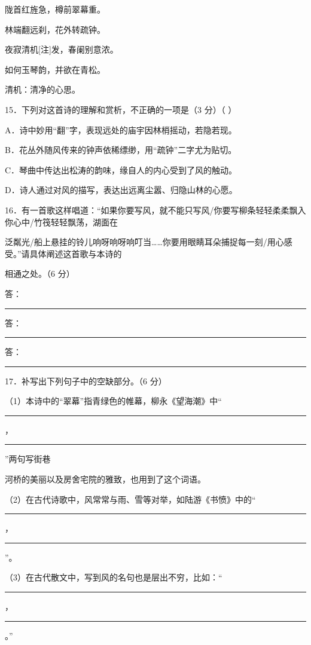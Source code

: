 \documentclass[UTF8,a4paper,fontset=fandol]{ctexart}
\begin{document}
\vspace{0.35em}\par
\hspace*{1.8em}陇首红旌急，樽前翠幕重。\par
\hspace*{1.8em}林端翻远刹，花外转疏钟。\par
\hspace*{1.8em}夜寂清机[注]发，春阑别意浓。\par
\hspace*{1.8em}如何玉琴韵，并欲在青松。\par
[注] 清机：清净的心思。\par
\vspace{0.35em}\par
15．下列对这首诗的理解和赏析，不正确的一项是（3 分）（ ）\par
A．诗中妙用“翻”字，表现远处的庙宇因林梢摇动，若隐若现。\par
B．花丛外随风传来的钟声依稀缥缈，用“疏钟”二字尤为贴切。\par
C．琴曲中传达出松涛的韵味，缘自人的内心受到了风的触动。\par
D．诗人通过对风的描写，表达出远离尘嚣、归隐山林的心愿。\par
\vspace{0.35em}\par
16．有一首歌这样唱道：“如果你要写风，就不能只写风/你要写柳条轻轻柔柔飘入你心中/竹筏轻轻飘荡，湖面在\par
泛粼光/船上悬挂的铃儿响呀响呀响叮当……你要用眼睛耳朵捕捉每一刻/用心感受。”请具体阐述这首歌与本诗的\par
相通之处。（6 分）\par
\noindent 答：\rule{0.88\linewidth}{0.35pt}\par
\noindent 答：\rule{0.88\linewidth}{0.35pt}\par
\noindent 答：\rule{0.88\linewidth}{0.35pt}\par
17．补写出下列句子中的空缺部分。（6 分）\par
（1）本诗中的“翠幕”指青绿色的帷幕，柳永《望海潮》中“\rule{0.080\linewidth}{0.35pt}，\rule{0.080\linewidth}{0.35pt}”两句写街巷\par
河桥的美丽以及房舍宅院的雅致，也用到了这个词语。\par
\clearpage
（2）在古代诗歌中，风常常与雨、雪等对举，如陆游《书愤》中的“\rule{0.080\linewidth}{0.35pt}，\rule{0.080\linewidth}{0.35pt}”。\par
（3）在古代散文中，写到风的名句也是层出不穷，比如：“\rule{0.080\linewidth}{0.35pt}，\rule{0.080\linewidth}{0.35pt}。”\par
\end{document}
